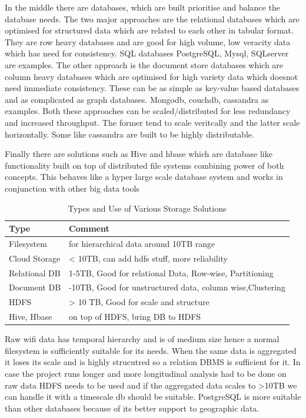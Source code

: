 In the middle there are databases, which are built prioritise and balance the database needs.
The two major approaches are the relational databases which are optimised for structured data which are related to each other in tabular format.
They are row heavy databases and are good for high volume, low veracity data which has need for consistency.
SQL databases PostgreSQL, Mysql, SQLserver are examples.
The other approach is the document store databases which are column heavy databases which are optimised for high variety data which doesnot need immediate consistency.
These can be as simple as key-value based databases and as complicated as graph databases.
Mongodb, couchdb, cassandra as examples.
Both these approaches can be scaled/distributed for less redundancy and increased throughput.
The former tend to scale veritcally and the latter scale horizontally.
Some like cassandra are built to be highly distributable.

Finally there are solutions such as Hive and hbase which are database like functionality built on top of distributed file systems combining power of both concepts.
This behaves like a hyper large scale database system and works in conjunction with other big data tools


\begin{table}[h]
  \footnotesize
  \begin{center}
    \begin{tabular}{ll}
      \toprule
        Type & Comment\\
      \midrule
        Filesystem & for hierarchical data around 10TB range\\
        Cloud Storage & \textless{}  10TB, can add hdfs stuff, more reliability\\
        Relational DB & 1-5TB, Good for relational Data, Row-wise, Partitioning\\
        Document DB & -10TB, Good for unstructured data, column wise,Clustering\\
        HDFS & \textgreater{} 10 TB, Good for scale and structure\\
        Hive, Hbase & on top of HDFS, bring DB to HDFS\\
      \bottomrule
    \end{tabular}
  \end{center}
  \caption{Types and Use of Various Storage Solutions}
  \label{table:toolkit:storage}
\end{table}


Raw wifi data has temporal hierarchy and is of medium size hence a normal filesystem is sufficiently suitable for its needs.
When the same data is aggregated it loses its scale and is highly strucutred so a relation DBMS is sufficient for it.
In case the project runs longer and more longitudinal analysis had to be done on raw data HDFS needs to be used and if the aggregated data scales to >10TB we can handle it with a timescale db should be suitable.
PostgreSQL is more suitable than other databases because of its better support to geographic data.

